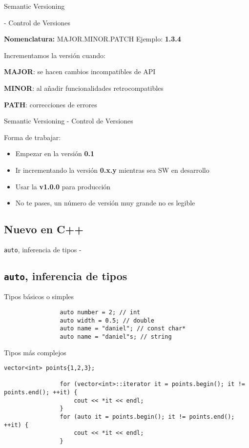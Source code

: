 \documentclass{beamer}
\newcommand{\normalSizeItem}[1] {
  \normalsize{\item #1}
}
\newcommand{\newFrameWithoutIndex}[1]{
	\begin{frame}
		#1
		\thispagestyle{empty}
	\end{frame}
}
\newcommand{\newSectionWithoutIndex}[1]{
	\newFrameWithoutIndex{\section{#1}}
}
\newcommand{\smallCite}[1]{
	\begin{small}
		\cite{#1}	
	\end{small}
}
\begin{document}
		\begin{frame}[fragile]{Semantic Versioning \smallCite{semanticVersioning} - Control de Versiones}	
			
			\textbf{Nomenclatura:} MAJOR.MINOR.PATCH
			\newline\newline
			Ejemplo: \textbf{1.3.4}
		
			Incrementamos la versión cuando:
			\begin{itemize}

				\normalSizeItem { \textbf{MAJOR}: se hacen cambios incompatibles de API}
				\normalSizeItem { \textbf{MINOR}: al añadir funcionalidades retrocompatibles }
				\normalSizeItem { \textbf{PATH}: correcciones de errores }
			\end{itemize}
		\end{frame}
		
		\begin{frame}[fragile]{Semantic Versioning - Control de Versiones}	
			
			Forma de trabajar:
			\begin{itemize}
				\item Empezar en la versión \textbf{0.1}
				\item Ir incrementando la versión \textbf{0.x.y }mientras sea SW en desarrollo
				\item Usar la \textbf{v1.0.0} para producción
				\item No te pases, un número de versión muy grande no es legible
			\end{itemize}
		\end{frame}
		
		\newSectionWithoutIndex{Nuevo en C++}	
		
		\begin{frame}[fragile]{\texttt{auto}, inferencia de tipos -\smallCite{cppReference}}\subsection{\texttt{auto}, inferencia de tipos}	
			\begin{itemize}
			
				\normalSizeItem{Tipos básicos o simples}
				\begin{lstlisting}
				auto number = 2; // int
				auto width = 0.5; // double
				auto name = "daniel"; // const char*
				auto name = "daniel"s; // string
				\end{lstlisting}
				
				\normalSizeItem{Tipos más complejos}
				\begin{lstlisting}[basicstyle={\tiny\ttfamily}]
				vector<int> points{1,2,3};
				
				for (vector<int>::iterator it = points.begin(); it != points.end(); ++it) {
					cout << *it << endl;
				}
				for (auto it = points.begin(); it != points.end(); ++it) {
					cout << *it << endl;
				}
				\end{lstlisting}
				
			\end{itemize}
		\end{frame}
		
\end{document}
